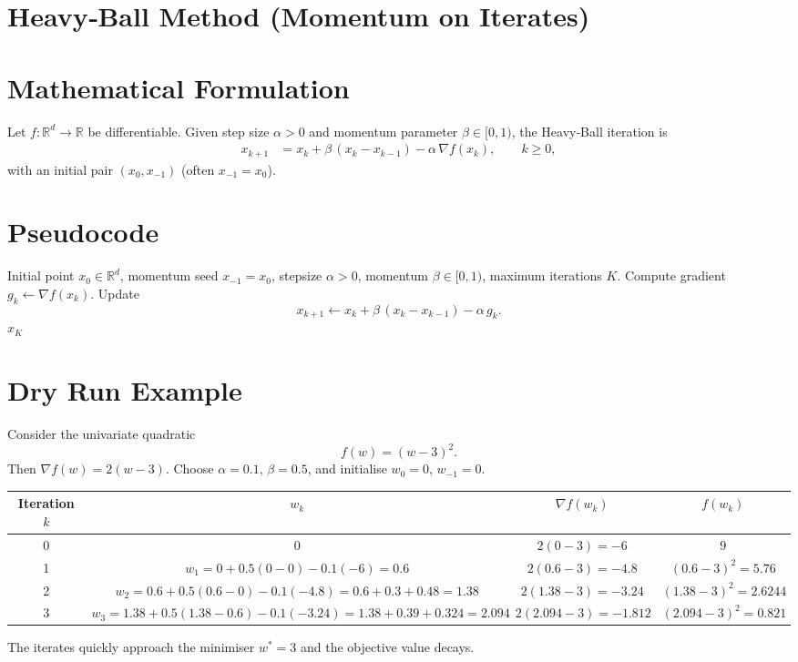 \documentclass[11pt]{article}
\newcommand{\R}{\mathbb{R}}
\begin{document}
\section*{Heavy‑Ball Method (Momentum on Iterates)}

\section*{Mathematical Formulation}
Let $f:\R^{d}\rightarrow\R$ be differentiable.  
Given step size $\alpha>0$ and momentum parameter $\beta\in[0,1)$, the Heavy‑Ball iteration is
\[
\boxed{
\begin{aligned}
x_{k+1}&=x_{k}+ \beta\,(x_{k}-x_{k-1})-\alpha \,\nabla f(x_{k}),\qquad k\ge 0,
\end{aligned}}
\]
with an initial pair $(x_{0},x_{-1})$ (often $x_{-1}=x_{0}$).

\section*{Pseudocode}
\begin{algorithm}[H]
\caption{Heavy‑Ball (HB) Method}
\begin{algorithmic}[1]
\REQUIRE Initial point $x_{0}\in\R^{d}$, momentum seed $x_{-1}=x_{0}$, stepsize $\alpha>0$, momentum $\beta\in[0,1)$, maximum iterations $K$.
    \STATE Compute gradient $g_{k}\gets \nabla f(x_{k})$.
    \STATE Update \[
        x_{k+1}\gets x_{k}+ \beta\,(x_{k}-x_{k-1})-\alpha\, g_{k}.
        \]
\ENDFOR
\RETURN $x_{K}$
\end{algorithmic}
\end{algorithm}

\section*{Dry Run Example}
Consider the univariate quadratic
\[
f(w)=(w-3)^{2}.
\]
Then $\nabla f(w)=2(w-3)$.  Choose $\alpha=0.1$, $\beta=0.5$, and initialise $w_{0}=0$, $w_{-1}=0$.

\begin{center}
\begin{tabular}{c|c|c|c}
Iteration $k$ & $w_{k}$ & $\nabla f(w_{k})$ & $f(w_{k})$ \\ \hline
0 & $0$ & $2(0-3)=-6$ & $9$ \\ 
1 & $w_{1}=0+0.5(0-0)-0.1(-6)=0.6$ & $2(0.6-3)=-4.8$ & $(0.6-3)^{2}=5.76$ \\ 
2 & $w_{2}=0.6+0.5(0.6-0)-0.1(-4.8)=0.6+0.3+0.48=1.38$ & $2(1.38-3)=-3.24$ & $(1.38-3)^{2}=2.6244$ \\ 
3 & $w_{3}=1.38+0.5(1.38-0.6)-0.1(-3.24)=1.38+0.39+0.324=2.094$ & $2(2.094-3)=-1.812$ & $(2.094-3)^{2}=0.821$ 
\end{tabular}
\end{center}
The iterates quickly approach the minimiser $w^{*}=3$ and the objective value decays.
\end{document}

